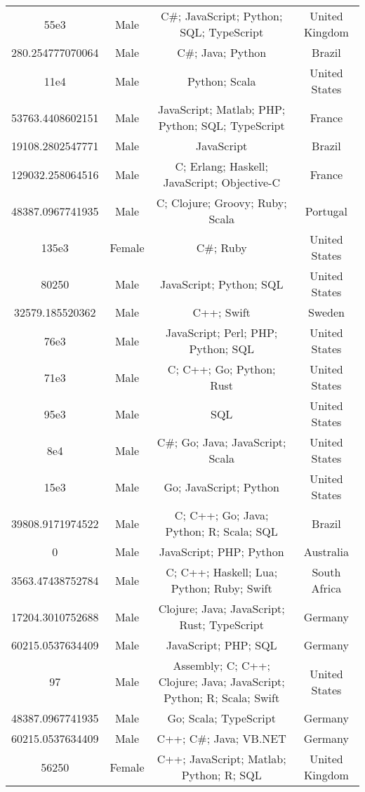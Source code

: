 \begin{center}
\begin{tabular}{ |c|c|c|c| }
55e3  &  Male  &  C\#; JavaScript; Python; SQL; TypeScript  &  United Kingdom  \\ 
280.254777070064  &  Male  &  C\#; Java; Python  &  Brazil  \\ 
11e4  &  Male  &  Python; Scala  &  United States  \\ 
53763.4408602151  &  Male  &  JavaScript; Matlab; PHP; Python; SQL; TypeScript  &  France  \\ 
19108.2802547771  &  Male  &  JavaScript  &  Brazil  \\ 
129032.258064516  &  Male  &  C; Erlang; Haskell; JavaScript; Objective-C  &  France  \\ 
48387.0967741935  &  Male  &  C; Clojure; Groovy; Ruby; Scala  &  Portugal  \\ 
135e3  &  Female  &  C\#; Ruby  &  United States  \\ 
80250  &  Male  &  JavaScript; Python; SQL  &  United States  \\ 
32579.185520362  &  Male  &  C++; Swift  &  Sweden  \\ 
76e3  &  Male  &  JavaScript; Perl; PHP; Python; SQL  &  United States  \\ 
71e3  &  Male  &  C; C++; Go; Python; Rust  &  United States  \\ 
95e3  &  Male  &  SQL  &  United States  \\ 
8e4  &  Male  &  C\#; Go; Java; JavaScript; Scala  &  United States  \\ 
15e3  &  Male  &  Go; JavaScript; Python  &  United States  \\ 
39808.9171974522  &  Male  &  C; C++; Go; Java; Python; R; Scala; SQL  &  Brazil  \\ 
0  &  Male  &  JavaScript; PHP; Python  &  Australia  \\ 
3563.47438752784  &  Male  &  C; C++; Haskell; Lua; Python; Ruby; Swift  &  South Africa  \\ 
17204.3010752688  &  Male  &  Clojure; Java; JavaScript; Rust; TypeScript  &  Germany  \\ 
60215.0537634409  &  Male  &  JavaScript; PHP; SQL  &  Germany  \\ 
97  &  Male  &  Assembly; C; C++; Clojure; Java; JavaScript; Python; R; Scala; Swift  &  United States  \\ 
48387.0967741935  &  Male  &  Go; Scala; TypeScript  &  Germany  \\ 
60215.0537634409  &  Male  &  C++; C\#; Java; VB.NET  &  Germany  \\ 
56250  &  Female  &  C++; JavaScript; Matlab; Python; R; SQL  &  United Kingdom  \\ 

\end{tabular}
\end{center}
